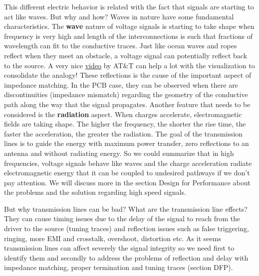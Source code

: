 \documentclass[final]{cubedoc}
\begin{document}
	
	
	This different electric behavior is related with the fact that signals are starting to act like waves. But why and how?
	Waves in nature have some fundamental characteristics. The \textbf{wave} nature of voltage signals is starting to take shape when frequency is very high and length of the interconnections is such that fractions of wavelength can fit to the conductive traces. Just like ocean waves and ropes reflect when they meet an obstacle, a voltage signal can potentially reflect back to the source. A very nice \href{https://www.youtube.com/watch?v=DovunOxlY1k}{video} by AT\&T can help a lot with the visualization to consolidate the analogy! These reflections is the cause of the important aspect of impedance matching. In the PCB case, they can be observed when there are discontinuities (impedance mismatch) regarding the geometry of the conductive path along the way that the signal propagates. Another feature that needs to be considered is the \textbf{radiation} aspect. When charges accelerate, electromagnetic fields are taking shape. The higher the frequency, the shorter the rise time, the faster the acceleration, the greater the radiation. The goal of the transmission lines is to guide the energy with maximum power transfer, zero reflections to an antenna and without radiating energy. So we could summarize that in high frequencies, voltage signals behave like waves and the charge acceleration radiate electromagnetic energy that it can be coupled to undesired pathways if we don't pay attention. We will discuss more in the section Design for Performance about the problems and the solution regarding high speed signals.
	
	But why transmission lines can be bad? What are the transmission line effects? They can cause timing issues due to the delay of the signal to reach from the driver to the source (tuning traces) and reflection issues such as false triggering, ringing, more EMI and crosstalk, overshoot, distortion etc. As it seems transmission lines can affect severely the signal integrity so we need first to identify them and secondly to address the problems of reflection and delay with impedance matching, proper termination and tuning traces (section DFP).
	
\end{document}
